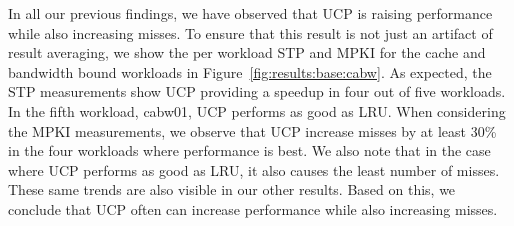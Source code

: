 In all our previous findings, we have observed that UCP is raising performance while also increasing misses.
To ensure that this result is not just an artifact of result averaging, we show the per workload STP and MPKI for the cache and bandwidth bound workloads in Figure~\ref{fig:results:base:cabw}.
As expected, the STP measurements show UCP providing a speedup in four out of five workloads.
In the fifth workload, cabw01, UCP performs as good as LRU.
When considering the MPKI measurements, we observe that UCP increase misses by at least 30\% in the four workloads where performance is best.
We also note that in the case where UCP performs as good as LRU, it also causes the least number of misses.
These same trends are also visible in our other results.
Based on this, we conclude that UCP often can increase performance while also increasing misses.